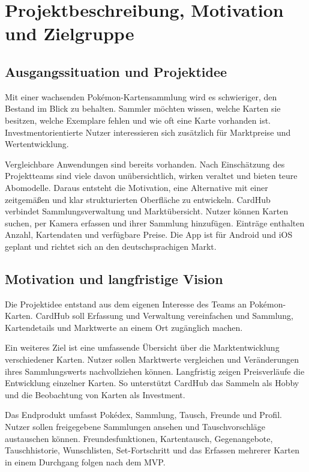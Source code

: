 \section{Projektbeschreibung, Motivation und Zielgruppe}

\subsection{Ausgangssituation und Projektidee}
Mit einer wachsenden Pokémon-Kartensammlung wird es schwieriger, den Bestand im Blick zu behalten. Sammler möchten wissen, welche Karten sie besitzen, welche Exemplare fehlen und wie oft eine Karte vorhanden ist. Investmentorientierte Nutzer interessieren sich zusätzlich für Marktpreise und Wertentwicklung.

Vergleichbare Anwendungen sind bereits vorhanden. Nach Einschätzung des Projektteams sind viele davon unübersichtlich, wirken veraltet und bieten teure Abomodelle. Daraus entsteht die Motivation, eine Alternative mit einer zeitgemäßen und klar strukturierten Oberfläche zu entwickeln. CardHub verbindet Sammlungsverwaltung und Marktübersicht. Nutzer können Karten suchen, per Kamera erfassen und ihrer Sammlung hinzufügen. Einträge enthalten Anzahl, Kartendaten und verfügbare Preise. Die App ist für Android und iOS geplant und richtet sich an den deutschsprachigen Markt.

\subsection{Motivation und langfristige Vision}
Die Projektidee entstand aus dem eigenen Interesse des Teams an Pokémon-Karten. CardHub soll Erfassung und Verwaltung vereinfachen und Sammlung, Kartendetails und Marktwerte an einem Ort zugänglich machen.

Ein weiteres Ziel ist eine umfassende Übersicht über die Marktentwicklung verschiedener Karten. Nutzer sollen Marktwerte vergleichen und Veränderungen ihres Sammlungswerts nachvollziehen können. Langfristig zeigen Preisverläufe die Entwicklung einzelner Karten. So unterstützt CardHub das Sammeln als Hobby und die Beobachtung von Karten als Investment.

Das Endprodukt umfasst Pokédex, Sammlung, Tausch, Freunde und Profil. Nutzer sollen freigegebene Sammlungen ansehen und Tauschvorschläge austauschen können. Freundesfunktionen, Kartentausch, Gegenangebote, Tauschhistorie, Wunschlisten, Set-Fortschritt und das Erfassen mehrerer Karten in einem Durchgang folgen nach dem MVP.

